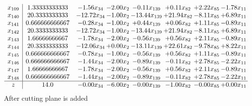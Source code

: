 \documentclass[8pt]{article}
\begin{document}
\[\begin{array}{c| c c@{\hskip 2pt} c@{\hskip 2pt} c@{\hskip 2pt} c@{\hskip 2pt} c@{\hskip 2pt} c@{\hskip 2pt} }
 x_{109}   &  1.33333333333 & -1.56 x_{34} & -2.00 x_{2} & -0.11 x_{139} & +  0.11 x_{82} & +  2.22 x_{85} & -1.78 x_{11}\\
 x_{140}   &  20.3333333333 & -12.72 x_{34} & -1.00 x_{2} & -13.44 x_{139} & + 21.94 x_{82} & -8.11 x_{85} & +  6.89 x_{11}\\
 x_{141}   &  0.666666666667 & -0.28 x_{34} & -1.00 x_{2} & +  0.44 x_{139} & +  0.06 x_{82} & +  1.11 x_{85} & -0.89 x_{11}\\
 x_{142}   &  20.3333333333 & -12.72 x_{34} & -1.00 x_{2} & -13.44 x_{139} & + 21.94 x_{82} & -8.11 x_{85} & +  6.89 x_{11}\\
 x_{143}   &  1.66666666667 & -1.78 x_{34} & -2.00 x_{2} & -0.56 x_{139} & +  0.56 x_{82} & +  2.11 x_{85} & -0.89 x_{11}\\
 x_{144}   &  20.3333333333 & -12.06 x_{34} & +  0.00 x_{2} & -13.11 x_{139} & + 22.61 x_{82} & -9.78 x_{85} & +  8.22 x_{11}\\
 x_{145}   &  0.666666666667 & -0.78 x_{34} & -1.00 x_{2} & -0.56 x_{139} & +  0.56 x_{82} & +  1.11 x_{85} & -0.89 x_{11}\\
 x_{146}   &  0.666666666667 & -1.44 x_{34} & -2.00 x_{2} & -0.89 x_{139} & -0.11 x_{82} & +  2.78 x_{85} & -2.22 x_{11}\\
 x_{147}   &  1.66666666667 & -1.78 x_{34} & -2.00 x_{2} & -0.56 x_{139} & +  0.56 x_{82} & +  2.11 x_{85} & -0.89 x_{11}\\
 x_{148}   &  0.666666666667 & -1.44 x_{34} & -2.00 x_{2} & -0.89 x_{139} & -0.11 x_{82} & +  2.78 x_{85} & -2.22 x_{11}\\
\hline
z    &  14.0 & -0.00 x_{34} & -6.00 x_{2} & -0.00 x_{139} & -1.00 x_{82} & -0.00 x_{85} & +  0.00 x_{11}\\
\end{array}\]
 After cutting plane is added 
\end{document}
